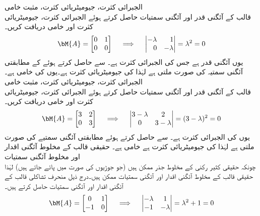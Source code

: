 \quad الجبرائی کثرت، جیومیٹریائی کثرت، مثبت خامی\\
قالب  کے آئگنی قدر اور آئگنی سمتیات حاصل کرتے ہوئے الجبرائی کثرت، جیومیٹریائی کثرت اور خامی دریافت کریں۔ 
\begin{align*}
\bM{A}=\begin{bmatrix}0&1\\0&0  \end{bmatrix}\quad \implies \quad \begin{vmatrix*}[r] -\lambda&1\\0&-\lambda \end{vmatrix*}=\lambda^2=0
\end{align*}
یوں  آئگنی قدر ہے جس کی الجبرائی کثرت  ہے۔  سے  حاصل کرتے ہوئے  کے مطابقتی آئگنی سمتیہ کی صورت  ملتی ہے لہٰذا  کی جیومیٹریائی کثرت  ہے۔یوں  کی خامی  ہے۔ 
\quad الجبرائی کثرت، جیومیٹریائی کثرت، مثبت خامی\\
قالب  کے آئگنی قدر اور آئگنی سمتیات حاصل کرتے ہوئے الجبرائی کثرت، جیومیٹریائی کثرت اور خامی دریافت کریں۔
\begin{align*}
\bM{A}=\begin{bmatrix}3&2\\0&3  \end{bmatrix}\quad \implies \quad \begin{vmatrix} 3-\lambda&2\\0&3-\lambda \end{vmatrix}=(3-\lambda)^2=0
\end{align*}
یوں  کی الجبرائی کثرت  ہے۔ سے  حاصل کرتے ہوئے مطابقتی آئگنی سمتیے کی صورت  ملتی ہے لہٰذا  کی جیومیٹریائی کثرت  ہے خامی  ہے۔ 
\quad حقیقی قالب کے مخلوط آئگنی اقدار اور مخلوط آئگنی سمتیات\\
چونکہ حقیقی کثیر رکنی کے مخلوط جذر ممکن ہیں (جو جوڑیوں کی صورت میں پائے جاتے ہیں) لہٰذا حقیقی قالب کے مخلوط آئگنی اقدار اور آئگنی سمتیات ممکن ہیں۔درج ذیل منحرف تشاکلی قالب  کے آئگنی اقدار اور آئگنی سمتیات حاصل کرتے ہیں۔
\begin{align*}
\bM{A}=\begin{bmatrix}0&1\\-1&0  \end{bmatrix}\quad \implies \quad \begin{vmatrix}-\lambda&1\\-1&-\lambda  \end{vmatrix}=\lambda^2+1=0
\end{align*}
